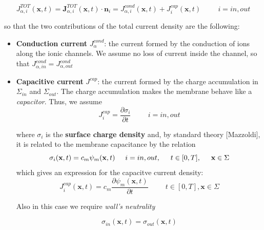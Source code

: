 \documentclass[a4paper]{article}
\begin{document}
\begin{equation}
J_{\alpha,i}^{TOT}(\textbf{x},t) =	\textbf{J}_{\alpha,i}^{TOT}(\textbf{x},t) \cdot \textbf{n}_{i} = J^{cond}_{\alpha,i}(\textbf{x},t) + J^{cap}_{i}(\textbf{x},t) \hspace{1cm} i= in,out
\end{equation}	

so that the two contributions of the total current density are the following:

\begin{itemize}
	
	\item \textbf{Conduction current} $J^{cond}_{\alpha}$: the current formed by the conduction of ions along the ionic channels. We assume no loss of current inside the channel, so that $J^{cond}_{\alpha, in} = J^{cond}_{\alpha, out}$
	
	\item \textbf{Capacitive current} $J^{cap}$: the current formed by the charge accumulation in $\Sigma_{in}$ and $\Sigma_{out}$. The charge accumulation makes the membrane behave like a \textit{capacitor}. Thus, we assume 
	\begin{equation}
	J^{cap}_{i} = \frac{\partial \sigma_{i}}{\partial t}  \hspace{1cm} i= in,out
	\end{equation}
	
	where $\sigma_{i}$ is the \textbf{surface charge density} and, by standard theory [Mazzoldi], it is related to the membrane capacitance by the relation 
	\begin{equation}
	\sigma_{i}(\textbf{x},t) = c_m \psi_m(\textbf{x},t)  \hspace{0.5cm}  i= in,out , \hspace{0.5 cm}  t \in [0,T] , \hspace{0.5 cm} \textbf{x} \in \Sigma
	\end{equation}  
	which gives an expression for the capacitve current density:
	\begin{equation}
	J^{cap}_{i}(\textbf{x},t) = c_m \frac{\partial \psi_m(\textbf{x},t)}{\partial t}  \hspace{1cm} t \in [0,T], \textbf{x} \in \Sigma
	\end{equation}
	
	Also in this case we require \textit{wall's neutrality}
	
	\begin{equation}
	\sigma_{in}(\textbf{x},t) = \sigma_{out}(\textbf{x},t)
	\end{equation}
\end{itemize}	
\end{document}
